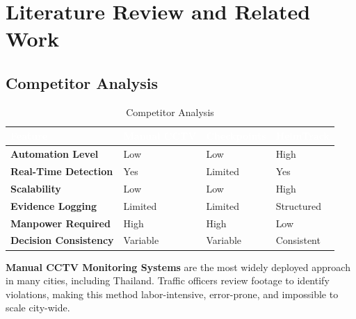 \chapter{Literature Review and Related Work}
\label{chap:relatedworks}

\section{Competitor Analysis}
\label{section:competitor-analysis}


\setlength{\extrarowheight}{6pt}
\begin{table}[h]
\centering
\begin{tabularx}{\textwidth}{|p{4.6cm}|>{\centering\arraybackslash}X|>{\centering\arraybackslash}X|>{\centering\arraybackslash}X|}

\rowcolor{tableheader}
\textcolor{white}{\textbf{Feature}} &
\textcolor{white}{\textbf{Manual CCTV}} &
\textcolor{white}{\textbf{Checkpoints}} &
\textcolor{white}{\textbf{HelmTrack}} \\
\hline
\rowcolor{tablerowA}
\textbf{Automation Level} & Low & Low & \cellcolor{helmcolor}High \\
\hline
\rowcolor{tablerowB}
\textbf{Real-Time Detection} & Yes & Limited & \cellcolor{helmcolor}Yes \\
\hline
\rowcolor{tablerowA}
\textbf{Scalability} & Low & Low & \cellcolor{helmcolor}High \\
\hline
\rowcolor{tablerowB}
\textbf{Evidence Logging} & Limited & Limited & \cellcolor{helmcolor}Structured \\
\hline
\rowcolor{tablerowA}
\textbf{Manpower Required} & High & High & \cellcolor{helmcolor}Low \\
\hline
\rowcolor{tablerowB}
\textbf{Decision Consistency} & Variable & Variable & \cellcolor{helmcolor}Consistent \\
\hline
\end{tabularx}
\caption{Competitor Analysis}
\end{table}
\setlength{\extrarowheight}{0pt}

\textbf{Manual CCTV Monitoring Systems} are the most widely deployed approach in many cities, including Thailand. Traffic officers review footage to identify violations, making this method labor-intensive, error-prone, and impossible to scale city-wide.

